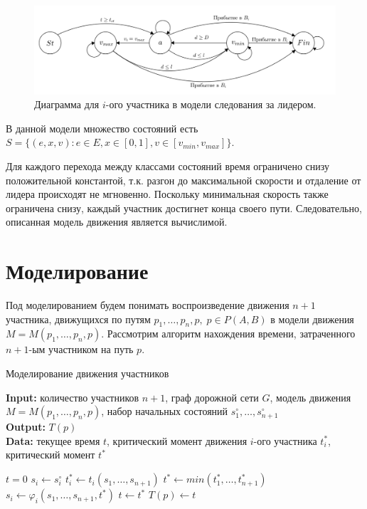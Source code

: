 \documentclass[12pt, a4paper]{article}
\begin{document}
	\fi
	\begin{figure}[H]
		\centering
		\includegraphics[scale=0.2]{Micro-gen.png}
		\caption{Диаграмма для $i$-ого участника в модели следования за лидером.}
		\label{ris:micro_diag}
	\end{figure}
	
	В данной модели множество состояний есть $S = \{(e, x, v): e \in E, x \in [0, 1], v \in [v_{min}, v_{max}]\}$.
	
	Для каждого перехода между классами состояний время ограничено снизу положительной константой, т.к. разгон до максимальной скорости и отдаление от лидера происходят не мгновенно. Поскольку минимальная скорость также ограничена снизу, каждый участник достигнет конца своего пути. Следовательно, описанная модель движения является вычислимой.
	
	\newpage
	\section{Моделирование}
	
	Под моделированием будем понимать воспроизведение движения $n+1$ участника, движущихся по путям $p_1, \dots, p_n, p, \; p \in P(A, B)$ в модели движения $M = M(p_1, \dots, p_n, p)$.
	Рассмотрим алгоритм нахождения времени, затраченного $n+1$-ым участником на путь $p$.
	
	\begin{algorithm}[H]
		\caption{Моделирование движения участников}
		\label{alg:modeling}
		{\bf {Input:}} количество участников $n+1$, граф дорожной сети $G$, модель движения $M = M(p_1, \dots, p_n, p)$, набор начальных состояний $s^{\circ}_1, \dots, s^{\circ}_{n+1}$\\
		{\bf {Output:}} $T(p)$\\
		{\bf {Data:}} текущее время $t$, критический момент движения $i$-ого участника $t^*_i$, критический момент $t^*$
		\begin{algorithmic}[1]
			\State $t = 0$
			\State $s_i \gets s^{\circ}_i$
			\EndFor
			\State $t^*_i \gets t_i(s_1, \dots, s_{n+1})$ 
			\EndFor
			\State $t^* \gets min \left(t^*_1, \dots, t^*_{n+1} \right)$
			\State $s_i \gets \varphi_i(s_1, \dots, s_{n+1}, t^*)$
			\EndFor
			\State $t \gets t^*$
			\EndWhile
			\State $T(p) \gets t$
		\end{algorithmic}
	\end{algorithm}
\end{document}
